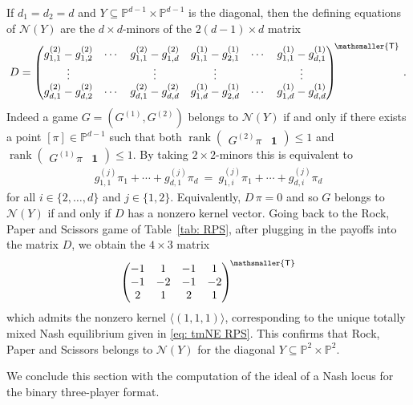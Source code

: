 \documentclass[12pt]{article}
\theoremstyle{definition}
\newenvironment{example}
{\pushQED{\qed}\renewcommand{\qedsymbol}{$\diamond$}\examplex}
{\popQED\endexamplex}
\newcommand{\PP}{{\mathbb P}}
\def\bone{{\boldsymbol{1}}}
\def\rank{\operatorname{rank}}
\newcommand{\mT}{\mathsmaller{\mathsf{T}}}
\newcommand{\kn}{{\mathcal N}}
\begin{document}
\begin{example}
If $d_1=d_2=d$ and $Y\subseteq \PP^{d-1}\times \PP^{d-1}$ is the diagonal, then the defining equations of $\kn(Y)$ are the $d\times d$-minors of the $2(d-1)\times d$ matrix
\begin{equation}\label{eq: def matrix D}
    D=
    \begin{pmatrix}
        g_{1,1}^{(2)}-g_{1,2}^{(2)} & \cdots & g_{1,1}^{(2)}-g_{1,d}^{(2)} & g_{1,1}^{(1)}-g_{2,1}^{(1)} & \cdots & g_{1,1}^{(1)}-g_{d,1}^{(1)} \\
        \vdots & & \vdots & \vdots & & \vdots \\
        g_{d,1}^{(2)}-g_{d,2}^{(2)} & \cdots & g_{d,1}^{(2)}-g_{d,d}^{(2)} & g_{1,d}^{(1)}-g_{2,d}^{(1)} & \cdots & g_{1,d}^{(1)}-g_{d,d}^{(1)}
    \end{pmatrix}^{\!\mT}\,.
\end{equation}
Indeed a game $G=(G^{(1)},G^{(2)})$ belongs to $\kn(Y)$ if and only if there exists a point $[\pi]\in \PP^{d-1}$ such that both $\rank\begin{pmatrix}G^{(2)}\pi &\bone\end{pmatrix}\le 1$ and $\rank\begin{pmatrix}G^{(1)}\pi &\bone\end{pmatrix}\le 1$. By taking $2\times 2$-minors this is equivalent to
\begin{align*}
    g_{1,1}^{(j)}\pi_1+\cdots+g_{d,1}^{(j)}\pi_d\ =\ g_{1,i}^{(j)}\pi_1+\cdots+g_{d,i}^{(j)}\pi_d
\end{align*}
for all $i\in\{2,\dots,d\}$ and $j\in\{1,2\}$. Equivalently, $D\,\pi=0$ and so $G$ belongs to $\kn(Y)$ if and only if $D$ has a nonzero kernel vector. Going back to the Rock, Paper and Scissors game of Table~\ref{tab: RPS}, after plugging in the payoffs into the matrix $D$, we obtain the $4\times 3$ matrix
\[
    \begin{pmatrix}
        -1 & 1 & -1 & 1\\
        -1 & -2 & -1 & -2\\
        2 & 1 & 2 & 1
    \end{pmatrix}^{\!\mT}
\]
which admits the nonzero kernel $\langle(1,1,1)\rangle$, corresponding to the unique totally mixed Nash equilibrium given in \eqref{eq: tmNE RPS}. This confirms that Rock, Paper and Scissors belongs to $\kn(Y)$ for the diagonal $Y\subseteq \PP^2\times\PP^2$.
\end{example}

We conclude this section with the computation of the ideal of a Nash locus for the binary three-player format.
\end{document}
